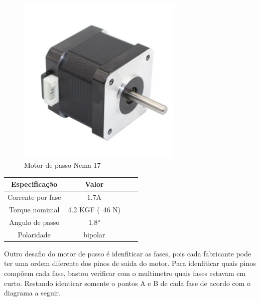 \begin{figure}[htb]
	\centering
	\includegraphics[width=0.7\textwidth]{figures/JK42HS40_1704_13A}
	\caption{Motor de passo Nema 17 \cite{motor_dc_6v_encoder}}
\end{figure}

\begin{quadro}[htb]
\caption{\label{Especificacoes_motordc_6v}Especificações do motor DC 6V}
	 \begin{tabular}{|c|c|c|c|}
		\hline
		\textbf{Especificação} & \textbf{Valor} \\ \hline
		Corrente por fase & 1.7A  \\ \hline
		Torque nomimal  & 4.2 KGF (~46 N) \\ \hline
		Angulo de passo & 1.8° \\ \hline
		Polaridade & bipolar \\ \hline
	\end{tabular}
\end{quadro}


Outro desafio do motor de passo é idenfiticar as fases, pois cada fabricante pode ter uma ordem diferente dos pinos de saida do motor.
Para idenfiticar quais pinos compõem cada fase, bastou verificar com o multimetro quais fases estavam em curto.
Restando identicar somente o pontos A e B de cada fase de acordo com o diagrama a seguir.

